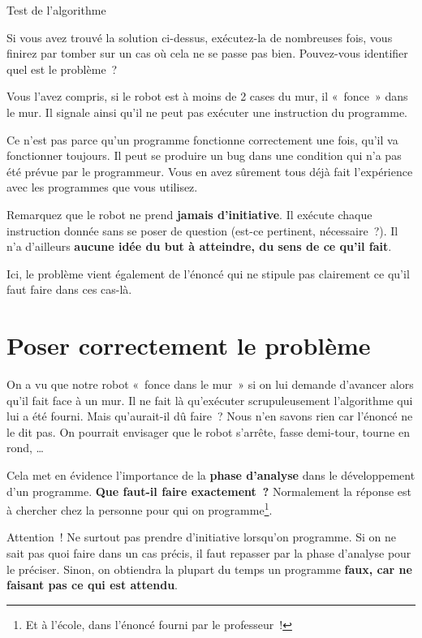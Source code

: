 	\begin{Emphase}[reflexion]{Test de l’algorithme}

		Si vous avez trouvé la solution ci-dessus, exécutez-la de nombreuses
		fois, vous finirez par tomber sur un cas où cela ne se passe pas bien.
		Pouvez-vous identifier quel est le problème~?

	\end{Emphase}

	Vous l’avez compris, si le robot est à moins de 2 cases
	du mur, il «~fonce~» dans le mur. Il signale ainsi
	qu’il ne peut pas exécuter une instruction du
	programme.
	
	Ce n’est pas parce qu’un programme
	fonctionne correctement une fois, qu’il va fonctionner
	toujours. Il peut se produire un bug dans une condition qui
	n’a pas été prévue par le programmeur. Vous en avez
	sûrement tous déjà fait l’expérience avec les
	programmes que vous utilisez.

	Remarquez que le robot ne prend \textbf{jamais
	d’initiative}. Il exécute chaque instruction donnée
	sans se poser de question (est-ce pertinent, nécessaire~?). Il
	n’a d’ailleurs \textbf{aucune idée du
	but à atteindre, du sens de ce qu’il fait}.
	
	Ici, le problème vient également de
	l’énoncé qui ne stipule pas clairement ce
	qu’il faut faire dans ces cas-là.

\section{Poser correctement le problème}

	On a vu que notre robot «~fonce dans le mur~» si on lui demande
	d’avancer alors qu’il fait face à un
	mur. Il ne fait là qu’exécuter scrupuleusement
	l’algorithme qui lui a été fourni. Mais
	qu’aurait-il dû faire~? Nous n’en
	savons rien car l’énoncé ne le dit pas. On pourrait
	envisager que le robot s’arrête, fasse demi-tour,
	tourne en rond, \dots
	
	Cela met en évidence l’importance de la \textbf{phase
	d’analyse} dans le développement d’un
	programme. \textbf{Que faut-il faire exactement~?} Normalement la
	réponse est à chercher chez la personne pour qui on programme\footnote{Et
	à l’école, dans l’énoncé fourni par
	le professeur~!}.
	
	Attention~! Ne surtout pas prendre d’initiative
	lorsqu’on programme. Si on ne sait pas quoi faire dans
	un cas précis, il faut repasser par la phase d’analyse
	pour le préciser. Sinon, on obtiendra la plupart du temps un programme
	\textbf{faux, car ne faisant pas ce qui est attendu}.

